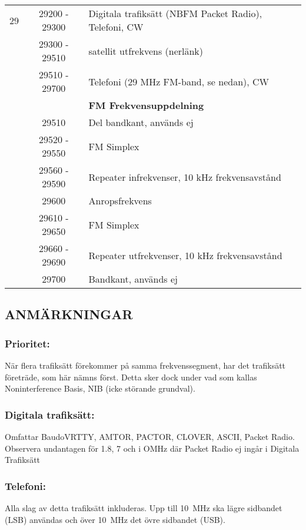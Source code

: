 \begin{longtable}{lcl}
29   & 29200 - 29300 & Digitala trafiksätt (NBFM Packet Radio), Telefoni, CW \\
     & 29300 - 29510 & satellit utfrekvens (nerlänk) \\
     & 29510 - 29700 & Telefoni (29 MHz FM-band, se nedan), CW \\
     &               & \textbf{FM Frekvensuppdelning} \\
     & 29510         & Del bandkant, används ej \\
     & 29520 - 29550 & FM Simplex \\
     & 29560 - 29590 & Repeater infrekvenser, 10 kHz frekvensavstånd \\
     & 29600         & Anropsfrekvens \\
     & 29610 - 29650 & FM Simplex \\
     & 29660 - 29690 & Repeater utfrekvenser, 10 kHz frekvensavstånd \\
     & 29700         & Bandkant, används ej \\
\end{longtable}

\subsection{ANMÄRKNINGAR}

\subsubsection{Prioritet:}

När flera trafiksätt förekommer på samma frekvenssegment, har det
trafiksätt företräde, som här nämns först. Detta sker dock under
vad som kallas Noninterference Basis, NIB (icke störande grundval).

\subsubsection{Digitala trafiksätt:}

Omfattar BaudoVRTTY, AMTOR, PACTOR, CLOVER, ASCII, Packet Radio.
Observera undantagen för 1.8, 7 och i OMHz där Packet Radio ej
ingår i Digitala Trafiksätt

\subsubsection{Telefoni:}

Alla slag av detta trafiksätt inkluderas.
Upp till 10~MHz ska lägre sidbandet (LSB) användas och över 10~MHz det övre
sidbandet (USB).

